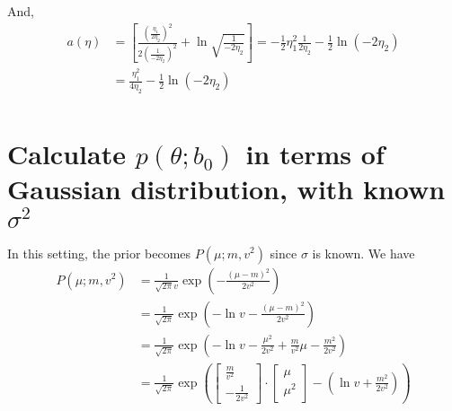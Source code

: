 \documentclass[12pt]{article}
\begin{document}
And,
\begin{align*}
  a(\eta) & =\left[\frac{\left(\frac{\eta_1}{2\eta_2}\right)^2}{2\left(\frac{1}{-2\eta_2}\right)^2}+\ln\sqrt{\frac{1}{-2\eta_2}}\right]=-\frac{1}{2}\eta_1^2\frac{1}{2\eta_2}-\frac{1}{2}\ln\left(-2\eta_2\right) \\
          & =\frac{\eta_1^2}{4\eta_2}-\frac{1}{2}\ln\left(-2\eta_2\right)                                                                                                                                         \\
\end{align*}

\newpage
\section*{Calculate $p(\theta;b_0)$ in terms of Gaussian distribution, with known $\sigma^2$}

In this setting, the prior becomes $P\left( \mu;m,v^2 \right)$ since $\sigma$ is known. We have
\begin{align*}
  P\left( \mu;m,v^2 \right) & =\frac{1}{\sqrt{2\pi}v}\exp\left( -\frac{(\mu-m)^2}{2v^2} \right)                                                                      \\
                            & =\frac{1}{\sqrt{2\pi}}\exp\left( -\ln v-\frac{(\mu-m)^2}{2v^2} \right)                                                                 \\
                            & =\frac{1}{\sqrt{2\pi}}\exp\left( -\ln v-\frac{\mu^2}{2v^2}+\frac{m}{v^2}\mu-\frac{m^2}{2v^2} \right)                                   \\
                            & =\frac{1}{\sqrt{2\pi}}\exp\left( \begin{bmatrix}
      \frac{m}{v^2} \\-\frac{1}{2v^2}
    \end{bmatrix}\cdot\begin{bmatrix}
      \mu \\\mu^2
    \end{bmatrix}-\left( \ln v+\frac{m^2}{2v^2} \right) \right)
\end{align*}
\end{document}
